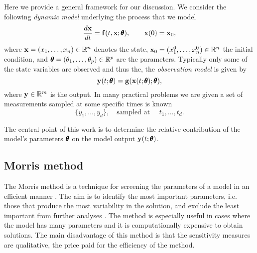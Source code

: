 \documentclass[a4paper, 12pt]{article}
\begin{document}
Here we provide a general framework for our discussion. We consider the foliowing {\it dynamic model} underlying the process that we model  
\begin{equation}\label{mod:dyn}
\frac{d\mathbf{x}}{dt}=\mathbf{f}(t,\mathbf{x};{\pmb{\theta}}),\qquad  \mathbf{x}(0)=\mathbf{x}_0,
\end{equation}
where $\mathbf{x} = (x_1,\ldots,x_n)\in\mathbb{R}^n$ denotes the state, $\mathbf{x}_0 = (x_1^0,\ldots,x_n^0)\in\mathbb{R}^n$ the initial condition, and ${\pmb{\theta}} = (\theta_1,\ldots,\theta_p)\in\mathbb{R}^p$ are the parameters.  Typically only some of the state variables are observed and thus the, the {\it observation model}  is given by
\begin{equation}\label{mod:obs}
\mathbf{y}(t;{\pmb{\theta}}) = \mathbf{g}(\mathbf{x}(t;{\pmb{\theta}});{\pmb{\theta}}),
\end{equation}
where $\mathbf{y}\in\mathbb{R}^m$ is the output.  In many practical problems we are given a set of measurements sampled at some specific times is known
\begin{equation}\label{mod:mea}
\{y_1,\ldots, y_d\},\quad \text{sampled at  }\quad t_1,\ldots, t_d.
\end{equation}


The central point of this work is to determine the relative contribution of the model's parameters ${\pmb{\theta}}$ on the model output $\mathbf{y}(t;{\pmb{\theta}})$. {}

\subsection{Morris method}

The Morris method is a technique for screening the parameters of a model in an efficient manner \cite{Morris1991}. The aim is to identify the most important parameters, i.e. those that produce the most variability in the solution, and exclude the least important from further analyses \cite{Saltelli2006}. The method is especially useful in cases where the model has many parameters and it is computationally expensive to obtain solutions. The main disadvantage of this method is that the sensitivity measures are qualitative, the price paid for the efficiency of the method.
\end{document}
